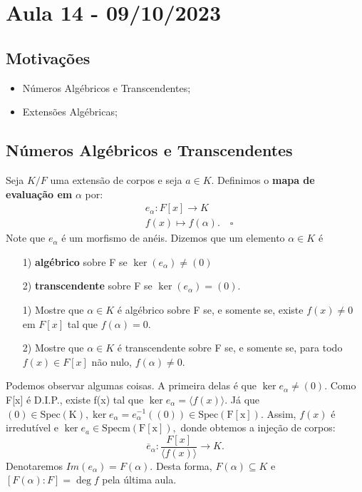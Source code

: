 \documentclass[AlgebraII/algebraII_notes.tex]{subfiles}
\begin{document}
\section{Aula 14 - 09/10/2023}
\subsection{Motivações}
\begin{itemize}
	\item Números Algébricos e Transcendentes;
	\item Extensões Algébricas;
\end{itemize}
\subsection{Números Algébricos e Transcendentes}
\begin{def*}
	Seja \(K/F\) uma extensão de corpos e seja \(a\in K\). Definimos o \textbf{mapa de evaluação em} \(\alpha \) por:
	\begin{align*}
		 & e_{\alpha }:F[x]\rightarrow K       \\
		 & f(x)\mapsto f(\alpha ).\quad\square
	\end{align*}
	Note que \(e_{\alpha }\) é um morfismo de anéis. Dizemos que um elemento \(\alpha \in K\) é
	\begin{itemize}
		\item[1)] \textbf{algébrico} sobre F se \(\ker{(e_{\alpha })}\neq(0)\)
		\item[2)] \textbf{transcendente} sobre F se \(\ker{(e_{\alpha })}=(0).\)
	\end{itemize}
\end{def*}
\begin{example}[Exercícios]
	\begin{itemize}
		\item[1)] Mostre que \(\alpha \in K\) é algébrico sobre F se, e somente se, existe \(f(x)\neq 0\) em \(F[x]\) tal que
		      \(f(\alpha ) = 0.\)
		\item[2)] Mostre que \(\alpha \in K\) é transcendente sobre F se, e somente se, para todo
		      \(f(x)\in F[x]\) não nulo, \(f(\alpha)\neq0.\)
	\end{itemize}
\end{example}
Podemos observar algumas coisas. A primeira delas é que \(\ker{e_{\alpha }}\neq(0).\) Como
F[x] é D.I.P., existe f(x) tal que \(\ker{e_{\alpha }} = \langle f(x) \rangle.\) Já que \((0)\in \mathrm{Spec(K)}, \ker{e_{\alpha }}=e_{\alpha }^{-1}((0))\in \mathrm{Spec(F[x])}.\)
Assim, \(f(x)\) é irredutível e \(\ker{e_{a}}\in \mathrm{Specm(F[x])},\) donde obtemos a injeção de corpos:
\[
	\overline{e}_{\alpha }:\frac{F[x]}{\langle f(x) \rangle}\rightarrow K.
\]
Denotaremos \(Im(e_{\alpha }) = F(\alpha ).\) Desta forma, \(F(\alpha )\subseteq{K}\) e \([F(\alpha ): F]=\deg{f}\) pela última aula.
\end{document}
